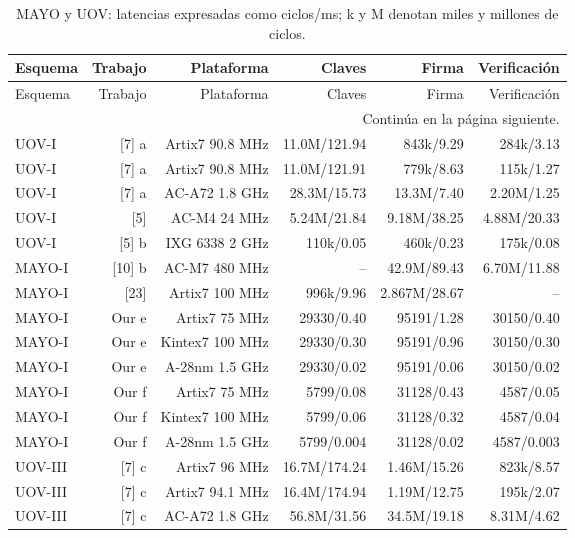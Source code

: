 \begin{longtable}{lrrrrr}
\caption{MAYO y UOV: latencias expresadas como ciclos/ms; k y M denotan miles y millones de ciclos.}\label{tab:eval-mayo-tiempos}\\
\toprule
Esquema & Trabajo & Plataforma & Claves & Firma & Verificación \\
\midrule
\endfirsthead
\toprule
Esquema & Trabajo & Plataforma & Claves & Firma & Verificación \\
\midrule
\endhead
\midrule
\multicolumn{6}{r}{\small Continúa en la página siguiente.}\\
\endfoot
\bottomrule
\endlastfoot
{UOV-I} & {[7] a} & {Artix7 90.8 MHz} & {11.0M/121.94} & {843k/9.29} & {284k/3.13} \\
{UOV-I} & {[7] a} & {Artix7 90.8 MHz} & {11.0M/121.91} & {779k/8.63} & {115k/1.27} \\
{UOV-I} & {[7] a} & {AC-A72 1.8 GHz} & {28.3M/15.73} & {13.3M/7.40} & {2.20M/1.25} \\
{UOV-I} & {[5]} & {AC-M4 24 MHz} & {5.24M/21.84} & {9.18M/38.25} & {4.88M/20.33} \\
{UOV-I} & {[5] b} & {IXG 6338 2 GHz} & {110k/0.05} & {460k/0.23} & {175k/0.08} \\
{MAYO-I} & {[10] b} & {AC-M7 480 MHz} & {--} & {42.9M/89.43} & {6.70M/11.88} \\
{MAYO-I} & {[23]} & {Artix7 100 MHz} & {996k/9.96} & {2.867M/28.67} & {--} \\
{MAYO-I} & {Our e} & {Artix7 75 MHz} & {29330/0.40} & {95191/1.28} & {30150/0.40} \\
{MAYO-I} & {Our e} & {Kintex7 100 MHz} & {29330/0.30} & {95191/0.96} & {30150/0.30} \\
{MAYO-I} & {Our e} & {A-28nm 1.5 GHz} & {29330/0.02} & {95191/0.06} & {30150/0.02} \\
{MAYO-I} & {Our f} & {Artix7 75 MHz} & {5799/0.08} & {31128/0.43} & {4587/0.05} \\
{MAYO-I} & {Our f} & {Kintex7 100 MHz} & {5799/0.06} & {31128/0.32} & {4587/0.04} \\
{MAYO-I} & {Our f} & {A-28nm 1.5 GHz} & {5799/0.004} & {31128/0.02} & {4587/0.003} \\
{UOV-III} & {[7] c} & {Artix7 96 MHz} & {16.7M/174.24} & {1.46M/15.26} & {823k/8.57} \\
{UOV-III} & {[7] c} & {Artix7 94.1 MHz} & {16.4M/174.94} & {1.19M/12.75} & {195k/2.07} \\
{UOV-III} & {[7] c} & {AC-A72 1.8 GHz} & {56.8M/31.56} & {34.5M/19.18} & {8.31M/4.62} \\

\end{longtable}
